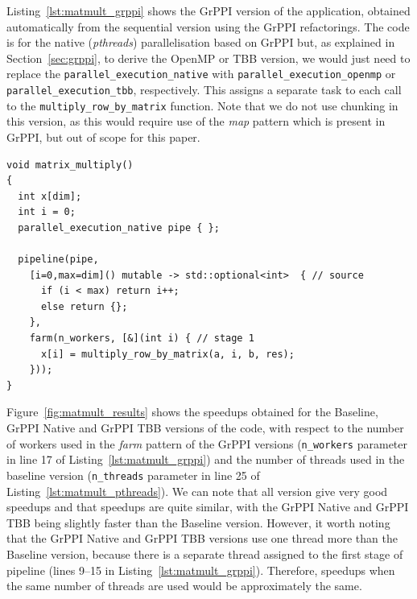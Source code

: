 \noindent
Listing~\ref{lst:matmult_grppi} shows the GrPPI version of the application, obtained automatically from the sequential version using the GrPPI refactorings. The code is for the native (\emph{pthreads}) parallelisation based on GrPPI but, as explained in Section~\ref{sec:grppi}, to derive the OpenMP or TBB version, we would just need to replace the \lstinline{parallel_execution_native} with \lstinline{parallel_execution_openmp} or \lstinline{parallel_execution_tbb}, respectively. This assigns a separate task to each call to the \lstinline{multiply_row_by_matrix} function. Note that we do not use chunking in this version, as this would require use of the \emph{map} pattern which is present in GrPPI, but out of scope for this paper.

\newpage
\begin{small}
  \begin{lstlisting}[caption=GrPPI Matrix Multiplication\label{lst:matmult_grppi}]
void matrix_multiply()
{
  int x[dim];
  int i = 0;
  parallel_execution_native pipe { };

  pipeline(pipe,
    [i=0,max=dim]() mutable -> std::optional<int>  { // source
      if (i < max) return i++;
      else return {};
    },
    farm(n_workers, [&](int i) { // stage 1
      x[i] = multiply_row_by_matrix(a, i, b, res);
    }));
}
  \end{lstlisting}  
\end{small}

\noindent
Figure~\ref{fig:matmult_results} shows the speedups obtained for the Baseline, GrPPI Native and GrPPI TBB versions of the code, with respect to the number of workers used in the \emph{farm} pattern of the GrPPI versions (\lstinline{n_workers} parameter in line 17 of Listing~\ref{lst:matmult_grppi}) and the number of threads used in the baseline version (\lstinline{n_threads} parameter in line 25 of Listing~\ref{lst:matmult_pthreads}). We can note that all version give very good speedups and that speedups are quite similar, with the GrPPI Native and GrPPI TBB being slightly faster than the Baseline version. However, it worth noting that the GrPPI Native and GrPPI TBB versions use one thread more than the Baseline version, because there is a separate thread assigned to the first stage of  pipeline (lines 9--15 in Listing~\ref{lst:matmult_grppi}). Therefore, speedups when the same number of threads are used would be approximately the same.


